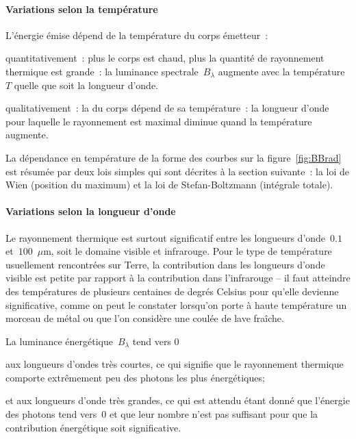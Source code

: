 \paragraph{Variations selon la température} 

\begin{finger}
\item L'énergie émise dépend de la température du corps émetteur~: 
\begin{citemize}
\item quantitativement~: plus le corps est chaud, plus la quantité de rayonnement thermique est grande~: la luminance spectrale~$B_{\lambda}$ augmente avec la température $T$ quelle que soit la longueur d'onde.
\item qualitativement~: la  du corps dépend de sa température~: la longueur d'onde pour laquelle le rayonnement est maximal diminue quand la température augmente.
\end{citemize}
\item La dépendance en température de la forme des courbes sur la figure~\ref{fig:BBrad} est résumée par deux lois simples qui sont décrites à la section suivante~: la loi de Wien (position du maximum) et la loi de Stefan-Boltzmann (intégrale totale).  
\end{finger}

\paragraph{Variations selon la longueur d'onde} 

\begin{finger} 
\item Le rayonnement thermique est surtout significatif entre les longueurs d'onde~$0.1$ et~$100$~$\mu$m, soit le domaine visible et infrarouge. Pour le type de température usuellement rencontrées sur Terre, la contribution dans les longueurs d'onde visible est petite par rapport à la contribution dans l'infrarouge -- il faut atteindre des températures de plusieurs centaines de degrés Celsius pour qu'elle devienne significative, comme on peut le constater lorsqu'on porte à haute température un morceau de métal ou que l'on considère une coulée de lave fraîche.
\item La luminance énergétique~$B_{\lambda}$ tend vers 0 
\begin{citemize}
\item aux longueurs d'ondes très courtes, ce qui signifie que le rayonnement thermique comporte extrêmement peu des photons les plus énergétiques;
\item et aux longueurs d'onde très grandes, ce qui est attendu étant donné que l'énergie des photons tend vers~$0$ et que leur nombre n'est pas suffisant pour que la contribution énergétique soit significative.
\end{citemize}
\end{finger}

